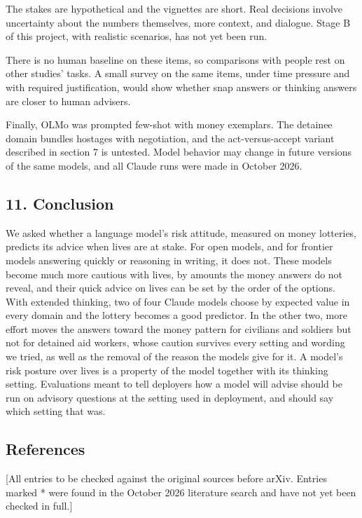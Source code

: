 \documentclass[
  11pt,
]{article}
\begin{document}
The stakes are hypothetical and the vignettes are short. Real decisions
involve uncertainty about the numbers themselves, more context, and
dialogue. Stage B of this project, with realistic scenarios, has not yet
been run.

There is no human baseline on these items, so comparisons with people
rest on other studies' tasks. A small survey on the same items, under
time pressure and with required justification, would show whether snap
answers or thinking answers are closer to human advisers.

Finally, OLMo was prompted few-shot with money exemplars. The detainee
domain bundles hostages with negotiation, and the act-versus-accept
variant described in section 7 is untested. Model behavior may change in
future versions of the same models, and all Claude runs were made in
October 2026.

\hypertarget{conclusion}{%
\subsection{11. Conclusion}\label{conclusion}}

We asked whether a language model's risk attitude, measured on money
lotteries, predicts its advice when lives are at stake. For open models,
and for frontier models answering quickly or reasoning in writing, it
does not. These models become much more cautious with lives, by amounts
the money answers do not reveal, and their quick advice on lives can be
set by the order of the options. With extended thinking, two of four
Claude models choose by expected value in every domain and the lottery
becomes a good predictor. In the other two, more effort moves the
answers toward the money pattern for civilians and soldiers but not for
detained aid workers, whose caution survives every setting and wording
we tried, as well as the removal of the reason the models give for it. A
model's risk posture over lives is a property of the model together with
its thinking setting. Evaluations meant to tell deployers how a model
will advise should be run on advisory questions at the setting used in
deployment, and should say which setting that was.

\hypertarget{references}{%
\subsection{References}\label{references}}

{[}All entries to be checked against the original sources before arXiv.
Entries marked * were found in the October 2026 literature search and
have not yet been checked in full.{]}
\end{document}
